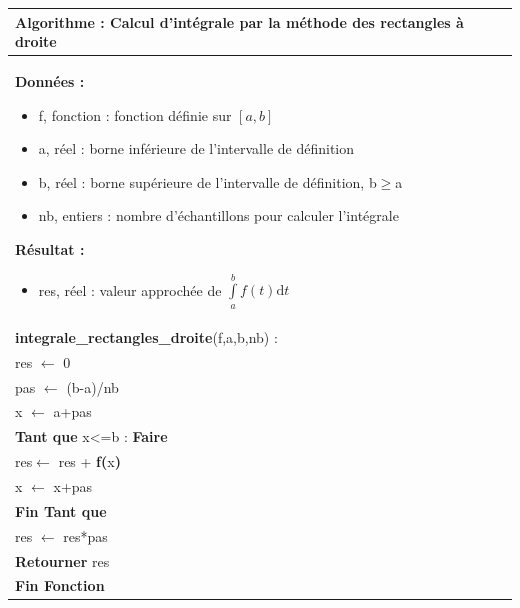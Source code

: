 \documentclass[10pt]{article}
\begin{document}
\begin{pseudo}
\begin{center}
\begin{tabular}{p{}}
\hline
\textbf{Algorithme :} Calcul d'intégrale par la méthode des rectangles à droite\\
\hline
\textbf{Données :}
\begin{itemize}
\item \textsf{f}, fonction : fonction définie sur $[a,b]$  
\item \textsf{a}, réel : borne inférieure de l'intervalle de définition
\item \textsf{b}, réel : borne supérieure de l'intervalle de définition, \textsf{b$\geq$a}
\item \textsf{nb}, entiers : nombre d'échantillons pour calculer l'intégrale
\end{itemize}
\textbf{Résultat :} 
\begin{itemize}
\item \textsf{res}, réel : valeur approchée de $\int\limits_a^b f(t)\text{d}t$
\end{itemize}
\\
\textbf{integrale\_rectangles\_droite}(\textsf{f,a,b,nb}) :\\
\hspace{.4cm}\textsf{res} $\leftarrow$ \textsf{0}\\
\hspace{.4cm}\textsf{pas} $\leftarrow$ \textsf{(b-a)/nb}\\
\hspace{.4cm}\textsf{x} $\leftarrow$ \textsf{a+pas}\\
\hspace{.4cm}\textbf{Tant que} \textsf{x<=b} : \textbf{Faire}\\
\hspace{.8cm}\textsf{res}$\leftarrow$ \textsf{res +} \textbf{f(}\textsf{x}\textbf{)}\\
\hspace{.8cm}\textsf{x} $\leftarrow$ \textsf{x+pas}\\
\hspace{.4cm}\textbf{Fin Tant que} \\
\hspace{.4cm} \textsf{res} $\leftarrow$ \textsf{res*pas}\\
\hspace{.4cm}\textbf{Retourner} \textsf{res}\\
\textbf{Fin Fonction} \\
\hline
\end{tabular}
\end{center}
\end{pseudo}
\end{document}
